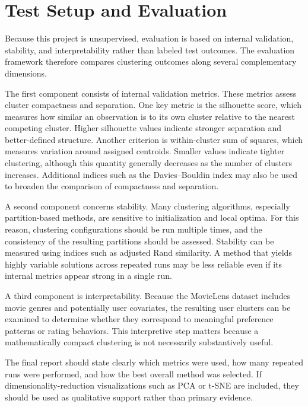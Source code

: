 \documentclass[
  11pt,
]{article}
\begin{document}
\section{Test Setup and Evaluation}\label{test-setup-and-evaluation}

Because this project is unsupervised, evaluation is based on internal
validation, stability, and interpretability rather than labeled test
outcomes. The evaluation framework therefore compares clustering
outcomes along several complementary dimensions.

The first component consists of internal validation metrics. These
metrics assess cluster compactness and separation. One key metric is the
silhouette score, which measures how similar an observation is to its
own cluster relative to the nearest competing cluster. Higher silhouette
values indicate stronger separation and better-defined structure.
Another criterion is within-cluster sum of squares, which measures
variation around assigned centroids. Smaller values indicate tighter
clustering, although this quantity generally decreases as the number of
clusters increases. Additional indices such as the Davies--Bouldin index
may also be used to broaden the comparison of compactness and
separation.

A second component concerns stability. Many clustering algorithms,
especially partition-based methods, are sensitive to initialization and
local optima. For this reason, clustering configurations should be run
multiple times, and the consistency of the resulting partitions should
be assessed. Stability can be measured using indices such as adjusted
Rand similarity. A method that yields highly variable solutions across
repeated runs may be less reliable even if its internal metrics appear
strong in a single run.

A third component is interpretability. Because the MovieLens dataset
includes movie genres and potentially user covariates, the resulting
user clusters can be examined to determine whether they correspond to
meaningful preference patterns or rating behaviors. This interpretive
step matters because a mathematically compact clustering is not
necessarily substantively useful.

The final report should state clearly which metrics were used, how many
repeated runs were performed, and how the best overall method was
selected. If dimensionality-reduction visualizations such as PCA or
t-SNE are included, they should be used as qualitative support rather
than primary evidence.
\end{document}
